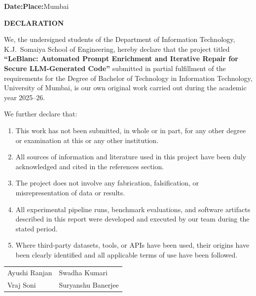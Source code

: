 \documentclass[12pt,a4paper]{report}
\begin{document}
\vspace{0.5in}
\noindent\textbf{Date:}\enspace\underline{\hspace{1.8in}}\hfill\textbf{Place:}\enspace Mumbai

\newpage
\thispagestyle{empty}
\begin{center}
  {\Large\bfseries DECLARATION}
\end{center}

\vspace{0.25in}
\noindent We, the undersigned students of the Department of Information Technology,
K.J.\ Somaiya School of Engineering, hereby declare that the project titled
\textbf{``LeBlanc: Automated Prompt Enrichment and Iterative Repair for Secure
LLM-Generated Code''} submitted in partial fulfillment of the requirements for the
Degree of Bachelor of Technology in Information Technology, University of Mumbai,
is our own original work carried out during the academic year 2025--26.

\vspace{0.15in}
\noindent We further declare that:
\begin{enumerate}
  \item This work has not been submitted, in whole or in part, for any other degree
        or examination at this or any other institution.
  \item All sources of information and literature used in this project have been duly
        acknowledged and cited in the references section.
  \item The project does not involve any fabrication, falsification, or
        misrepresentation of data or results.
  \item All experimental pipeline runs, benchmark evaluations, and software
        artifacts described in this report were developed and executed by our team
        during the stated period.
  \item Where third-party datasets, tools, or APIs have been used, their origins
        have been clearly identified and all applicable terms of use have been
        followed.
\end{enumerate}

\vspace{0.45in}
\noindent
\begin{tabular}{@{}p{2.8in}p{2.5in}@{}}
  Ayushi Ranjan      & Swadha Kumari      \\[0.5in]
  Vraj Soni          & Suryanshu Banerjee \\
\end{tabular}
\end{document}
